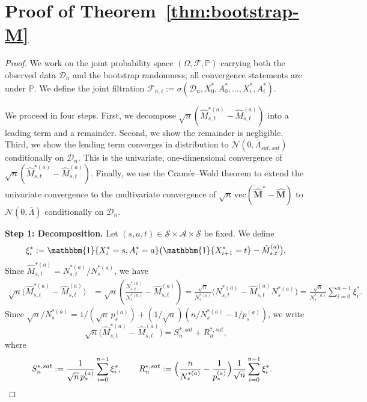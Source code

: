 \documentclass{article}
\numberwithin{equation}{section}
\newcommand{\indicator}{\mathbbm{1}}
\begin{document}
\section{Proof of Theorem~\ref{thm:bootstrap-M}}
\label{app:proofs}

\begin{proof}
We work on the joint probability space $(\Omega,\mathcal{F},\mathbb{P})$ carrying both the observed data $\mathcal{D}_n$ and the bootstrap randomness; all convergence statements are under $\mathbb{P}$. We define the joint filtration $\mathcal{F}_{n,i}:=\sigma(\mathcal{D}_n,X_0^\ast,A_0^\ast,\ldots,X_i^\ast,A_i^\ast)$. 

We proceed in four steps.
First, we decompose $\sqrt{n}(\hat M_{s,t}^{\ast(a)}-\hat M_{s,t}^{(a)})$ into a leading term and a remainder. 
Second, we show the remainder is negligible. 
Third, we show the leading term converges in distribution to $\mathcal{N}(0,\bar\Lambda_{sat,sat})$ conditionally on $\mathcal{D}_n$. 
This is the univariate, one-dimensional convergence of $\sqrt{n}(\hat M_{s,t}^{\ast(a)}-\hat M_{s,t}^{(a)})$.
Finally, we use the Cram\'er--Wold theorem to extend the univariate convergence to the multivariate convergence of $\sqrt{n}\,\mathrm{vec}(\hat{\mathbf{M}}^\ast-\hat{\mathbf{M}})$ to $\mathcal{N}(0,\bar\Lambda)$ conditionally on $\mathcal{D}_n$.

\medskip\noindent\textbf{Step 1: Decomposition.}
Let $(s,a,t)\in\mathcal{S}\times\mathcal{A}\times\mathcal{S}$ be fixed. We define
\[
\xi_i^\ast := \indicator\{X_i^\ast=s,A_i^\ast=a\}\bigl(\indicator\{X_{i+1}^\ast=t\}-\hat M_{s,t}^{(a)}\bigr).
\]
Since $\hat M_{s,t}^{\ast(a)}=N_{s,t}^{\ast(a)}/N_s^{\ast(a)}$, we have
\begin{align*}
\sqrt{n}\bigl(\hat M_{s,t}^{\ast(a)}-\hat M_{s,t}^{(a)}\bigr)
&= \sqrt{n}\!\left(\frac{N_{s,t}^{\ast(a)}}{N_s^{\ast(a)}}-\hat M_{s,t}^{(a)}\right)
 = \frac{\sqrt{n}}{N_s^{\ast(a)}}\bigl(N_{s,t}^{\ast(a)}-\hat M_{s,t}^{(a)}N_s^{\ast(a)}\bigr)
 = \frac{\sqrt{n}}{N_s^{\ast(a)}}\sum_{i=0}^{n-1}\xi_i^\ast.
\end{align*}
Since $\sqrt{n}/N_s^{\ast(a)} = 1/(\sqrt{n}\,p_s^{(a)}) + (1/\sqrt{n})(n/N_s^{\ast(a)}-1/p_s^{(a)})$, we write
\[
\sqrt{n}\bigl(\hat M_{s,t}^{\ast(a)}-\hat M_{s,t}^{(a)}\bigr) = S_n^{\ast,sat}+R_n^{\ast,sat},
\]
where
\begin{align*}
S_n^{\ast,sat} &:= \frac{1}{\sqrt{n}\,p_s^{(a)}}\sum_{i=0}^{n-1}\xi_i^\ast,\qquad
R_n^{\ast,sat} := \Bigl(\frac{n}{N_s^{\ast(a)}}-\frac{1}{p_s^{(a)}}\Bigr)\frac{1}{\sqrt{n}}\sum_{i=0}^{n-1}\xi_i^\ast.
\end{align*}


\end{proof}
\end{document}
